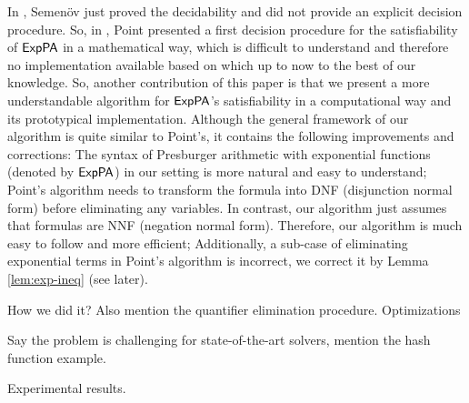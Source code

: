 In \cite{Semenov84}, Semen\"{o}v just proved the decidability and did not provide an explicit decision procedure. So, in  \cite{Point86}, Point presented a first decision procedure for the satisfiability of ${\sf ExpPA}$ in a mathematical way, which is difficult to understand and therefore no implementation available based on which up to now to the best of our knowledge. So, another contribution of this paper is that we present a more understandable algorithm for ${\sf ExpPA}$'s satisfiability in a computational way and its prototypical implementation. Although the general framework of our algorithm is quite similar to Point's,  it contains the following improvements and corrections: 
   The syntax of Presburger arithmetic with exponential functions (denoted by ${\sf ExpPA}$) in our setting is more natural and easy to understand; Point's algorithm needs to transform the formula into DNF (disjunction normal form) before  eliminating any variables. In contrast, our algorithm just assumes that formulas are NNF (negation normal form). Therefore, our algorithm is much easy to follow and more efficient; Additionally, a sub-case of eliminating exponential terms in Point's algorithm is incorrect, we correct it by Lemma \ref{lem:exp-ineq} (see later).

How we did it? Also mention the quantifier elimination procedure. Optimizations

Say the problem is challenging for state-of-the-art solvers, mention the hash function example.

Experimental results.